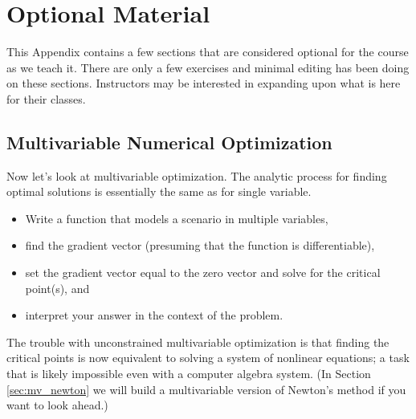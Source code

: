 \chapter{Optional Material}
This Appendix contains a few sections that are considered optional for the course as we
teach it.  There are only a few exercises and minimal editing has been doing on these
sections.  Instructors may be interested in expanding upon what is here for their classes.



\newpage\section{Multivariable Numerical Optimization}
Now let's look at multivariable optimization.  The analytic process for finding optimal
solutions is essentially the same as for single variable.
\begin{itemize}
    \item Write a function that models a scenario in multiple variables,
    \item find the gradient vector (presuming that the function is differentiable),
    \item set the gradient vector equal to the zero vector and solve for the critical point(s), and
    \item interpret your answer in the context of the problem.
\end{itemize}
The trouble with unconstrained multivariable optimization is that finding the critical
points is now equivalent to solving a system of nonlinear equations; a task that is likely
impossible even with a computer algebra system.  (In Section \ref{sec:mv_newton} we will
build a multivariable version of Newton's method if you want to look ahead.)

